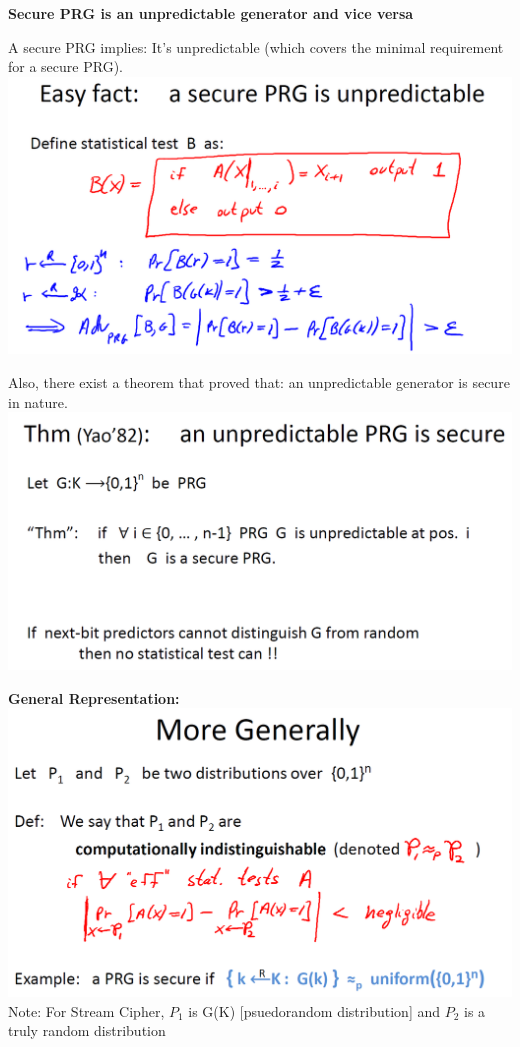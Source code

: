 \documentclass[11pt]{article}
\makeatletter
\def\maxwidth{\ifdim\Gin@nat@width>\linewidth\linewidth
    \else\Gin@nat@width\fi}
\let\Oldincludegraphics\includegraphics
\renewcommand{\includegraphics}[1]{\Oldincludegraphics[width=.8\maxwidth]{#1}}
\makeatother
\begin{document}
\textbf{Secure PRG is an unpredictable generator and vice versa}

A secure PRG implies: It's unpredictable (which covers the minimal
requirement for a secure PRG).
\includegraphics{./Images/SecureMeanUnpredict.png}

Also, there exist a theorem that proved that: an unpredictable generator
is secure in nature. \includegraphics{./Images/UnpredictMeanSecure.png}

\textbf{General Representation:}
\includegraphics{./Images/GeneralSecure.png} Note: For Stream Cipher,
\(P_{1}\) is G(K) {[}psuedorandom distribution{]} and \(P_{2}\) is a
truly random distribution
\end{document}
